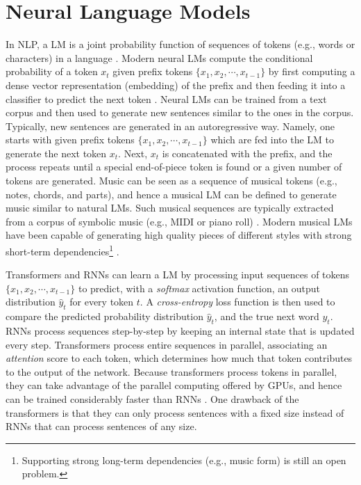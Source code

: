 \section{Neural Language Models}

In NLP, a LM is a joint probability function of sequences of tokens (e.g., words or characters) in a language \cite{bengio2003neural}. Modern neural LMs compute the conditional probability of a token $x_t$ given prefix tokens $\{x_1, x_2, \cdots, x_{t-1}\}$ by first computing a dense vector representation (embedding) of the prefix and then feeding it into a classifier to predict the next token \cite{sun2021revisiting}. Neural LMs can be trained from a text corpus and then used to generate new sentences similar to the ones in the corpus. Typically, new sentences are generated in an autoregressive way. Namely, one starts with given prefix tokens $\{x_1, x_2, \cdots, x_{t-1}\}$ which are fed into the LM to generate the next token $x_t$. Next, $x_t$ is concatenated with the prefix, and the process repeats until a special end-of-piece token is found or a given number of tokens are generated. Music can be seen as a sequence of musical tokens (e.g., notes, chords, and parts), and hence a musical LM can be defined to generate music similar to natural LMs. Such musical sequences are typically extracted from a corpus of symbolic music (e.g., MIDI or piano roll) \cite{briot2017deep}. Modern musical LMs have been capable of generating high quality pieces of different styles with strong short-term dependencies\footnote{Supporting strong long-term dependencies (e.g., music form) is still an open problem.} \cite{huang2018music}.

Transformers and RNNs can learn a LM by processing input sequences of tokens $\{x_1, x_2, \cdots, x_{t-1}\}$ to predict, with a \textit{softmax} activation function, an output distribution $\hat{y}_t$ for every token $t$. A \textit{cross-entropy} loss function is then used to compare the predicted probability distribution $\hat{y}_t$, and the true next word $y_t$. RNNs process sequences step-by-step by keeping an internal state that is updated every step. Transformers process entire sequences in parallel, associating an \textit{attention} score to each token, which determines how much that token contributes to the output of the network. Because transformers process tokens in parallel, they can take advantage of the parallel computing offered by GPUs, and hence can be trained considerably faster than RNNs \cite{vaswani2017attention}. One drawback of the transformers is that they can only process sentences with a fixed size instead of RNNs that can process sentences of any size.

